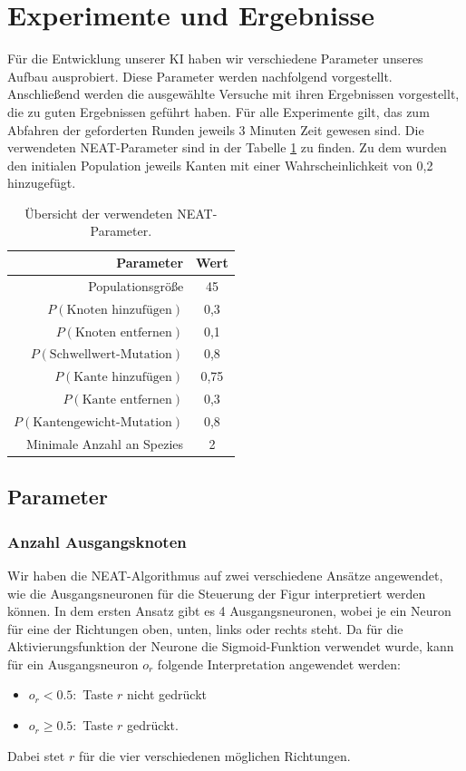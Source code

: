 \documentclass[11pt,final,journal,a4paper,towside,towcolumn]{IEEEtran}
\begin{document}
\section{Experimente und Ergebnisse}

Für die Entwicklung unserer \ac{KI} haben wir verschiedene Parameter unseres Aufbau ausprobiert. Diese Parameter werden nachfolgend vorgestellt. Anschließend werden die ausgewählte Versuche mit ihren Ergebnissen vorgestellt, die zu guten Ergebnissen geführt haben.
Für alle Experimente gilt, das zum Abfahren der geforderten Runden jeweils 3 Minuten Zeit gewesen sind. Die verwendeten \ac{NEAT}-Parameter sind in der Tabelle \ref{tab:NEAT} zu finden.
Zu dem wurden den initialen Population jeweils Kanten mit einer Wahrscheinlichkeit von 0,2 hinzugefügt.
\begin{table}
	\setlength{}
	\caption{Übersicht der verwendeten \ac{NEAT}-Parameter.}
	\label{tab:NEAT}
	\centering
	\begin{tabular}{|r|c|}
		\hline
		Parameter & Wert \\\hline\hline
		Populationsgröße & 45 \\\hline
		$P\left(\textrm{Knoten hinzufügen}\right)$ & 0,3 \\\hline
		$P\left(\textrm{Knoten entfernen}\right)$ & 0,1 \\\hline
		$P\left(\textrm{Schwellwert-Mutation}\right)$ & 0,8 \\\hline
		$P\left(\textrm{Kante hinzufügen}\right)$ & 0,75 \\\hline
		$P\left(\textrm{Kante entfernen}\right)$ & 0,3 \\\hline
		$P\left(\textrm{Kantengewicht-Mutation}\right)$ & 0,8 \\\hline
		Minimale Anzahl an Spezies & 2 \\\hline
	\end{tabular}
\end{table}
\subsection{Parameter}
\subsubsection*{Anzahl Ausgangsknoten}
Wir haben die \ac{NEAT}-Algorithmus auf zwei verschiedene Ansätze angewendet, wie die Ausgangsneuronen für die Steuerung der Figur interpretiert werden können. 
In dem ersten Ansatz gibt es 4 Ausgangsneuronen, wobei je ein Neuron für eine der Richtungen oben, unten, links oder rechts steht. Da für die Aktivierungsfunktion der Neurone die Sigmoid-Funktion verwendet wurde, kann für ein Ausgangsneuron $o_r$ folgende Interpretation angewendet werden:
\begin{itemize}
	\item $o_r < 0.5:$ Taste $r$ nicht gedrückt
	\item $o_r \geq 0.5:$ Taste $r$ gedrückt.
\end{itemize}
Dabei stet $r$ für die vier verschiedenen möglichen Richtungen.
\end{document}
